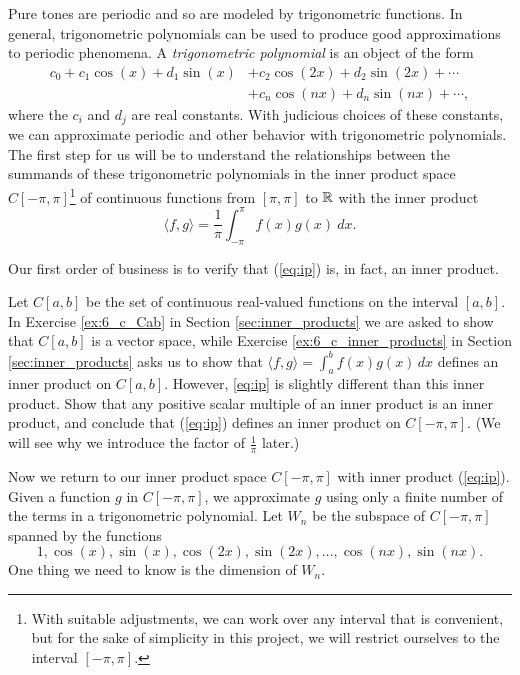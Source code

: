 Pure tones are periodic and so are modeled by trigonometric functions. In general, trigonometric polynomials can be used to produce good approximations to periodic phenomena. A \emph{trigonometric polynomial} is an object of the form
\begin{align*}
c_0 + c_1 \cos(x) + d_1\sin(x) &+ c_2\cos(2x) + d_2\sin(2x) + \cdots \\
	&+ c_n \cos(nx) + d_n \sin(nx) + \cdots,
\end{align*}
where the $c_i$ and $d_j$ are real constants. With judicious choices of these constants, we can approximate periodic and other behavior with trigonometric polynomials. The first step for us will be to understand the relationships between the summands of these trigonometric polynomials in the inner product space $C[-\pi, \pi]$\footnote{With suitable adjustments, we can work over any interval that is convenient, but for the sake of simplicity in this project, we will restrict ourselves to the interval $[-\pi, \pi]$.} of continuous functions from $[\pi, \pi]$ to $\mathbb{R}$ with the inner product
\begin{equation}
\langle f,g \rangle = \frac{1}{\pi} \int_{-\pi}^{\pi} f(x)g(x) \ dx. \label{eq:ip}
\end{equation}

Our first order of business is to verify that (\ref{eq:ip}) is, in fact, an inner product. 

\begin{pactivity} \label{act:Fourier_inner_product} Let $C[a,b]$ be the set of continuous real-valued functions on the interval $[a,b]$. In Exercise \ref{ex:6_c_Cab} in Section \ref{sec:inner_products} we are asked to show that $C[a,b]$ is a vector space, while Exercise \ref{ex:6_c_inner_products} in Section \ref{sec:inner_products} asks us to show that $\langle f,g \rangle = \int_a^b f(x)g(x) \, dx$ defines an inner product on $C[a,b]$. However, \ref{eq:ip} is slightly different than this inner product. Show that any positive scalar multiple of an inner product is an inner product, and conclude that (\ref{eq:ip}) defines an inner product on $C[-\pi,\pi]$. (We will see why we introduce the factor of $\frac{1}{\pi}$ later.)


\end{pactivity}

Now we return to our inner product space $C[-\pi,\pi]$ with inner product (\ref{eq:ip}). Given a function $g$ in $C[-\pi,\pi]$, we approximate $g$ using only a finite number of the terms in a trigonometric polynomial. Let $W_n$ be the subspace of $C[-\pi,\pi]$ spanned by the functions
\[1, \cos(x), \sin(x), \cos(2x), \sin(2x), \ldots, \cos(nx), \sin(nx).\]
One thing we need to know is the dimension of $W_n$.

